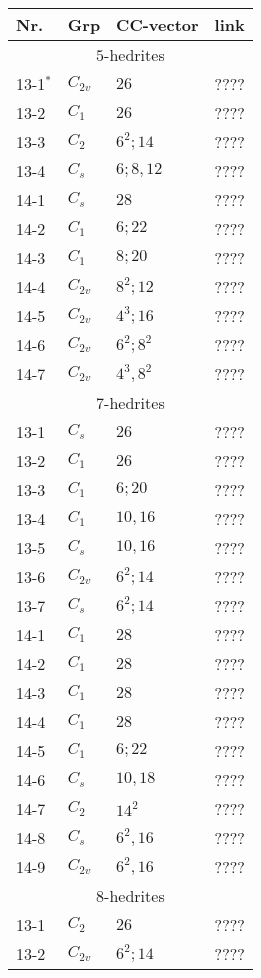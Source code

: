 \documentclass[12pt]{article}
\begin{document}
\begin{table}
\begin{center}
{\small
\begin{minipage}{6cm}
\begin{tabular}{||l|l|l|l||}
\hline
Nr.	&Grp 	&CC-vector	&link\\\hline
\multicolumn{4}{||c||}{$5$-hedrites}\\\hline
13-1${}^*$&$C_{2v}$	&$26$		&????\\
13-2	&$C_1$	&$26$		&????\\
13-3	&$C_2$	&$6^2; 14$	&????\\
13-4	&$C_s$	&$6; 8, 12$	&????\\\hline
14-1	&$C_s$	&$28$		&????\\
14-2	&$C_1$	&$6; 22$		&????\\
14-3	&$C_1$	&$8; 20$		&????\\
14-4	&$C_{2v}$	&$8^2; 12$	&????\\
14-5	&$C_{2v}$	&$4^3; 16$	&????\\
14-6	&$C_{2v}$	&$6^2; 8^2$	&????\\
14-7	&$C_{2v}$	&$4^3, 8^2$	&????\\\hline
\hline
\multicolumn{4}{||c||}{$7$-hedrites}\\\hline
13-1	&$C_s$	&$26$		&????\\
13-2	&$C_1$	&$26$		&????\\
13-3	&$C_1$	&$6; 20$		&????\\
13-4	&$C_1$	&$10, 16$		&????\\
13-5	&$C_s$	&$10, 16$		&????\\
13-6	&$C_{2v}$	&$6^2; 14$	&????\\
13-7	&$C_{s}$	&$6^2; 14$	&????\\\hline
14-1	&$C_1$	&$28$		&????\\
14-2	&$C_1$	&$28$		&????\\
14-3	&$C_1$	&$28$		&????\\
14-4	&$C_1$	&$28$		&????\\
14-5	&$C_1$	&$6; 22$		&????\\
14-6	&$C_s$	&$10, 18$		&????\\
14-7	&$C_2$	&$14^2$		&????\\
14-8	&$C_s$	&$6^2, 16$	&????\\
14-9	&$C_{2v}$	&$6^2, 16$	&????\\\hline
\hline
\multicolumn{4}{||c||}{$8$-hedrites}\\\hline
13-1	&$C_2$	&$26$		&????\\
13-2	&$C_{2v}$	&$6^2; 14$	&????\\\hline

\end{tabular}
\end{minipage}}
\end{center}
\end{table}
\end{document}
